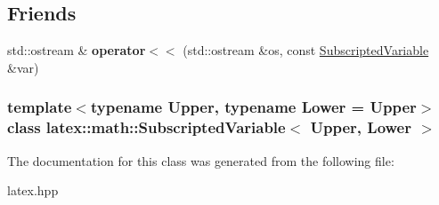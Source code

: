 \subsection*{\-Friends}
\begin{DoxyCompactItemize}
\item 
\hypertarget{classlatex_1_1math_1_1SubscriptedVariable_a01e65ae2af0e238ef39391dd37bbe33d}{std\-::ostream \& {\bfseries operator$<$$<$} (std\-::ostream \&os, const \hyperlink{classlatex_1_1math_1_1SubscriptedVariable}{\-Subscripted\-Variable} \&var)}\label{classlatex_1_1math_1_1SubscriptedVariable_a01e65ae2af0e238ef39391dd37bbe33d}

\end{DoxyCompactItemize}
\subsubsection*{template$<$typename Upper, typename Lower = \-Upper$>$ class latex\-::math\-::\-Subscripted\-Variable$<$ Upper, Lower $>$}



\-The documentation for this class was generated from the following file\-:\begin{DoxyCompactItemize}
\item 
latex.\-hpp\end{DoxyCompactItemize}
